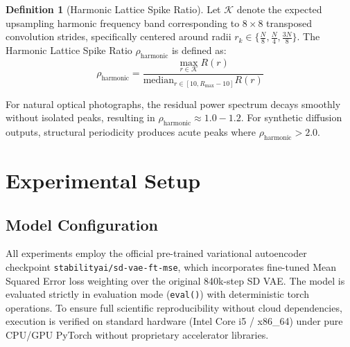 \documentclass[conference]{IEEEtran}
\theoremstyle{definition}
\newtheorem{definition}{Definition}
\begin{document}
\begin{definition}[Harmonic Lattice Spike Ratio]
Let $\mathcal{K}$ denote the expected upsampling harmonic frequency band corresponding to $8\times 8$ transposed convolution strides, specifically centered around radii $r_k \in \{ \frac{N}{8}, \frac{N}{4}, \frac{3N}{8} \}$. The Harmonic Lattice Spike Ratio $\rho_{\text{harmonic}}$ is defined as:
\begin{equation}
\rho_{\text{harmonic}} = \frac{\max_{r \in \mathcal{K}} R(r)}{\text{median}_{r \in [10, R_{\max}-10]} R(r)}
\end{equation}
\end{definition}

For natural optical photographs, the residual power spectrum decays smoothly without isolated peaks, resulting in $\rho_{\text{harmonic}} \approx 1.0 - 1.2$. For synthetic diffusion outputs, structural periodicity produces acute peaks where $\rho_{\text{harmonic}} > 2.0$.

\section{Experimental Setup}

\subsection{Model Configuration}
All experiments employ the official pre-trained variational autoencoder checkpoint \texttt{stabilityai/sd-vae-ft-mse}, which incorporates fine-tuned Mean Squared Error loss weighting over the original 840k-step SD VAE. The model is evaluated strictly in evaluation mode (\texttt{eval()}) with deterministic torch operations. To ensure full scientific reproducibility without cloud dependencies, execution is verified on standard hardware (Intel Core i5 / x86\_64) under pure CPU/GPU PyTorch without proprietary accelerator libraries.
\end{document}
